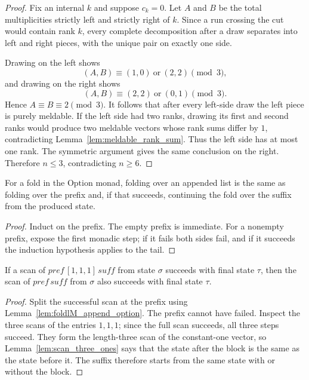 \begin{proof}

\leanok
  Fix an internal \(k\) and suppose \(c_k=0\).  Let \(A\) and \(B\)
  be the total multiplicities strictly left and strictly right of \(k\).
  Since a run crossing the cut would contain rank \(k\), every complete
  decomposition after a draw separates into left and right pieces, with
  the unique pair on exactly one side.

  Drawing on the left shows
  \[
    (A,B)\equiv(1,0)\ \text{or}\ (2,2)\pmod3,
  \]
  and drawing on the right shows
  \[
    (A,B)\equiv(2,2)\ \text{or}\ (0,1)\pmod3.
  \]
  Hence \(A\equiv B\equiv2\pmod3\).  It follows that after every
  left-side draw the left piece is purely meldable.  If the left side had
  two ranks, drawing its first and second ranks would produce two meldable
  vectors whose rank sums differ by \(1\), contradicting
  Lemma~\ref{lem:meldable_rank_sum}.  Thus the left side has at most one
  rank.  The symmetric argument gives the same conclusion on the right.
  Therefore \(n\leq3\), contradicting \(n\geq6\).
\end{proof}

\begin{lemma}

  \label{lem:foldlM_append_option}
  For a fold in the \(\mathrm{Option}\) monad, folding over an appended
  list is the same as folding over the prefix and, if that succeeds,
  continuing the fold over the suffix from the produced state.
\end{lemma}
\begin{proof}

\leanok
  Induct on the prefix.  The empty prefix is immediate.  For a nonempty
  prefix, expose the first monadic step; if it fails both sides fail, and
  if it succeeds the induction hypothesis applies to the tail.
\end{proof}

\begin{lemma}

  \label{lem:scan_delete_three_ones_block}
  If a scan of \(\mathit{pref}\,[1,1,1]\,\mathit{suff}\) from state
  \(\sigma\) succeeds with final state \(\tau\), then the scan of
  \(\mathit{pref}\,\mathit{suff}\) from \(\sigma\) also succeeds with
  final state \(\tau\).
\end{lemma}
\begin{proof}

\leanok
  Split the successful scan at the prefix using
  Lemma~\ref{lem:foldlM_append_option}.  The prefix cannot have failed.
  Inspect the three scans of the entries \(1,1,1\); since the full scan
  succeeds, all three steps succeed.  They form the length-three scan of
  the constant-one vector, so Lemma~\ref{lem:scan_three_ones} says that
  the state after the block is the same as the state before it.  The
  suffix therefore starts from the same state with or without the block.
\end{proof}

